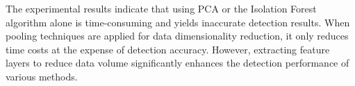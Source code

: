 \documentclass[conference]{IEEEtran}
\begin{document}






The experimental results indicate that using PCA or the Isolation Forest algorithm alone is time-consuming and yields inaccurate detection results. When pooling techniques\cite{betterTogether} are applied for data dimensionality reduction, it only reduces time costs at the expense of detection accuracy. However, extracting feature layers to reduce data volume significantly enhances the detection performance of various methods.
\end{document}
